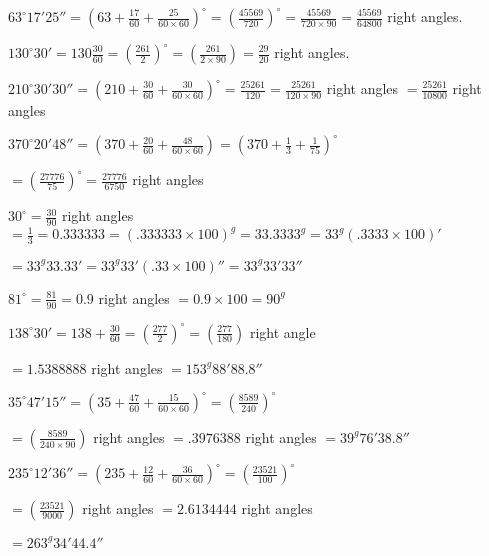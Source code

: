 \item $63^\circ17'25'' = \left(63 + \frac{17}{60} + \frac{25}{60\times 60}\right)^\circ = \left(\frac{45569}{720}\right)^\circ =
   \frac{45569}{720\times90} = \frac{45569}{64800}$ right angles.

\item $130^\circ30' = 130\frac{30}{60} = \left(\frac{261}{2}\right)^\circ = \left(\frac{261}{2\times 90}\right) = \frac{29}{20}$
   right angles.

\item $210^\circ30'30'' = \left(210 + \frac{30}{60} + \frac{30}{60\times 60}\right)^\circ = \frac{25261}{120} =
   \frac{25261}{120\times 90}$ right angles $= \frac{25261}{10800}$ right angles

\item $370^\circ 20'48'' = \left(370 + \frac{20}{60} + \frac{48}{60\times 60}\right) = \left(370 + \frac{1}{3} +
    \frac{1}{75}\right)^\circ$

    $= \left(\frac{27776}{75}\right)^\circ = \frac{27776}{6750}$ right angles

\item $30^\circ = \frac{30}{90}$ right angles $= \frac{1}{3} = 0.333333 = (.333333 \times 100)^g = 33.3333^g =
    33^g(.3333\times 100)'$

    $= 33^g33.33' = 33^g33'(.33\times 100)'' = 33^g33'33''$

\item $81^\circ = \frac{81}{90} = 0.9$ right angles $= 0.9 \times 100 = 90^g$

\item $138^\circ 30' = 138 + \frac{30}{60} = \left(\frac{277}{2}\right)^\circ = \left(\frac{277}{180}\right)$ right angle

    $= 1.5388888$ right angles $= 153^g88'88.8''$

\item $35^\circ47'15'' = \left(35 + \frac{47}{60} + \frac{15}{60\times 60}\right)^\circ = \left(\frac{8589}{240}\right)^\circ$

    $= \left(\frac{8589}{240\times 90}\right)$ right angles $= .3976388$ right angles $=39^g76'38.8''$

\item $235^\circ12'36'' = \left(235 + \frac{12}{60} + \frac{36}{60\times 60}\right)^\circ =
    \left(\frac{23521}{100}\right)^\circ$

    $= \left(\frac{23521}{9000}\right)$ right angles $= 2.6134444$ right angles

    $= 263^g34'44.4''$

